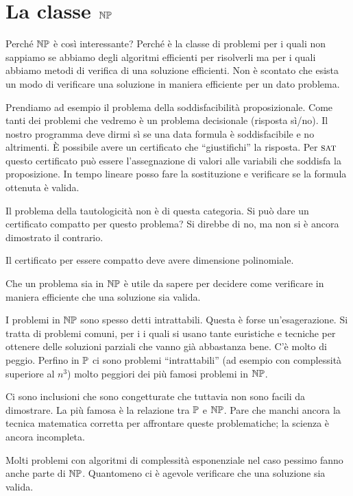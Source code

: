 \section{La classe $\mathbb{NP}$}

Perché $\mathbb{NP}$ è così interessante? Perché è la classe di problemi per i quali non sappiamo se
abbiamo degli algoritmi efficienti per risolverli ma per i quali abbiamo metodi di verifica di una
soluzione efficienti. Non è scontato che esista un modo di verificare una soluzione in maniera
efficiente per un dato problema.

Prendiamo ad esempio il problema della soddisfacibilità proposizionale. Come tanti dei problemi che
vedremo è un problema decisionale (risposta sì/no). Il nostro programma deve dirmi sì se una data
formula è soddisfacibile e no altrimenti. È possibile avere un certificato che ``giustifichi'' la
risposta. Per $\textsc{sat}$ questo certificato può essere l'assegnazione di valori alle variabili che
soddisfa la proposizione. In tempo lineare posso fare la sostituzione e verificare se la formula
ottenuta è valida.

Il problema della tautologicità non è di questa categoria. Si può dare un certificato compatto
per questo problema? Si direbbe di no, ma non si è ancora dimostrato il contrario.

Il certificato per essere compatto deve avere dimensione polinomiale.

Che un problema sia in $\mathbb{NP}$ è utile da sapere per decidere come verificare in maniera efficiente che
una soluzione sia valida.

I problemi in $\mathbb{NP}$ sono spesso detti intrattabili. Questa è forse un'esagerazione. Si tratta
di problemi comuni, per i i quali si usano tante euristiche e tecniche per ottenere delle soluzioni
parziali che vanno già abbastanza bene. C'è molto di peggio. Perfino in $\mathbb{P}$ ci sono problemi
``intrattabili'' (ad esempio con complessità superiore al $n^{3}$) molto peggiori dei più famosi
problemi in $\mathbb{NP}$.

Ci sono inclusioni che sono congetturate che tuttavia non sono facili da dimostrare. La più famosa
è la relazione tra $\mathbb{P}$ e $\mathbb{NP}$. Pare che manchi ancora la tecnica matematica corretta
per affrontare queste problematiche; la scienza è ancora incompleta.

Molti problemi con algoritmi di complessità esponenziale nel caso pessimo fanno anche parte di
$\mathbb{NP}$. Quantomeno ci è agevole verificare che una soluzione sia valida.


